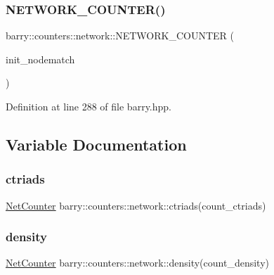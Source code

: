 \subsubsection{\texorpdfstring{N\+E\+T\+W\+O\+R\+K\+\_\+\+C\+O\+U\+N\+T\+E\+R()}{NETWORK\_COUNTER()}\hspace{0.1cm}{\footnotesize\ttfamily [14/14]}}
{\footnotesize\ttfamily barry\+::counters\+::network\+::\+N\+E\+T\+W\+O\+R\+K\+\_\+\+C\+O\+U\+N\+T\+ER (\begin{DoxyParamCaption}\item[{init\+\_\+nodematch}]{ }\end{DoxyParamCaption})}



Definition at line 288 of file barry.\+hpp.



\subsection{Variable Documentation}
\mbox{\label{namespacebarry_1_1counters_1_1network_a67940daab1e0101588a05d84d6f9ad22}} 
\subsubsection{\texorpdfstring{ctriads}{ctriads}}
{\footnotesize\ttfamily \hyperlink{namespacebarry_1_1counters_1_1network_a2d14cbc0a77bfba218df85a750bfeb84}{Net\+Counter} barry\+::counters\+::network\+::ctriads(count\+\_\+ctriads)}

\mbox{\label{namespacebarry_1_1counters_1_1network_aa15d84663778df2b26161a2812cbd4c6}} 
\subsubsection{\texorpdfstring{density}{density}}
{\footnotesize\ttfamily \hyperlink{namespacebarry_1_1counters_1_1network_a2d14cbc0a77bfba218df85a750bfeb84}{Net\+Counter} barry\+::counters\+::network\+::density(count\+\_\+density)}

